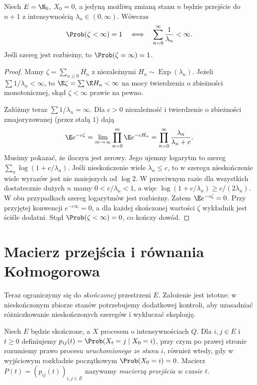 \begin{twierdzenie}
\label{thm:pure-birth-explosion}
Niech $E=\N_0$, $X_0=0$, a jedyną możliwą zmianą stanu
$n$ będzie przejście do $n+1$ z intensywnością
$\lambda_n\in(0,\infty)$. Wówczas
\[
\Prob(\zeta<\infty)=1
\quad\Longleftrightarrow\quad
\sum_{n=0}^\infty\frac1{\lambda_n}<\infty.
\]
Jeśli szereg jest rozbieżny, to $\Prob(\zeta=\infty)=1$.
\end{twierdzenie}
\begin{proof}
Mamy $\zeta=\sum_{n\ge0}H_n$ z niezależnymi
$H_n\sim\operatorname{Exp}(\lambda_n)$.
Jeżeli $\sum1/\lambda_n<\infty$, to
$\E\zeta=\sum\E H_n<\infty$ na mocy twierdzenia o
zbieżności monotonicznej, skąd $\zeta<\infty$ prawie na pewno.

Załóżmy teraz $\sum1/\lambda_n=\infty$.
Dla $c>0$ niezależność i twierdzenie o zbieżności
zmajoryzowanej (przez stałą $1$) dają
\[
\E e^{-c\zeta}
=\lim_{m\to\infty}\prod_{n=0}^m\E e^{-cH_n}
=\prod_{n=0}^\infty\frac{\lambda_n}{\lambda_n+c}.
\]
Musimy pokazać, że iloczyn jest zerowy. Jego ujemny logarytm
to szereg $\sum_n\log(1+c/\lambda_n)$.
Jeśli nieskończenie wiele $\lambda_n\le c$, to w szeregu
nieskończenie wiele wyrazów jest nie mniejszych od $\log2$.
W przeciwnym razie dla wszystkich dostatecznie dużych $n$
mamy $0<c/\lambda_n<1$, a więc
$\log(1+c/\lambda_n)\ge c/(2\lambda_n)$.
W obu przypadkach szereg logarytmów jest rozbieżny.
Zatem $\E e^{-c\zeta}=0$.
Przy przyjętej konwencji $e^{-c\infty}=0$, a dla każdej
skończonej wartości $\zeta$ wykładnik jest ściśle dodatni.
Stąd $\Prob(\zeta<\infty)=0$, co kończy dowód.
\end{proof}

\section{Macierz przejścia i równania Kołmogorowa}
Teraz ograniczymy się do \emph{skończonej} przestrzeni $E$.
Założenie jest istotne: w nieskończonym zbiorze stanów
potrzebujemy dodatkowej kontroli, aby uzasadniać różniczkowanie
nieskończonych szeregów i wykluczać eksplozję.

\begin{definicja}
Niech $E$ będzie skończone, a $X$ procesem o intensywnościach
$Q$. Dla $i,j\in E$ i $t\ge0$ definiujemy
$p_{ij}(t)=\Prob(X_t=j\mid X_0=i)$,
przy czym po prawej stronie rozumiemy prawo procesu
\emph{uruchomionego ze stanu $i$}, również wtedy,
gdy w wyjściowym rozkładzie początkowym $\Prob(X_0=i)=0$.
Macierz $P(t)=(p_{ij}(t))_{i,j\in E}$ nazywamy
\emph{macierzą przejścia w czasie $t$}.
\end{definicja}

